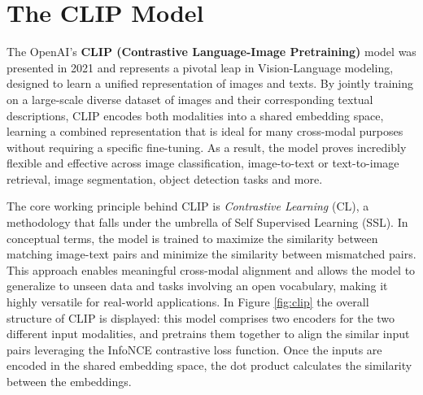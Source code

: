 \documentclass[a4paper, oneside, english]{sapthesis} %
\begin{document}




\chapter{The CLIP Model} %

The OpenAI's \textbf{CLIP (Contrastive Language-Image Pretraining)} model \cite{radford2021learning} was presented in 2021 and represents a pivotal leap in Vision-Language modeling, designed to learn a unified representation of images and texts. By jointly training on a large-scale diverse dataset of images and their corresponding textual descriptions, CLIP encodes both modalities into a shared embedding space, learning a combined representation that is ideal for many cross-modal purposes without requiring a specific fine-tuning. As a result, the model proves incredibly flexible and effective across image classification, image-to-text or text-to-image retrieval, image segmentation, object detection tasks and more.

The core working principle behind CLIP is \emph{Contrastive Learning} (CL), a methodology that falls under the umbrella of Self Supervised Learning (SSL). In conceptual terms, the model is trained to maximize the similarity between matching image-text pairs and minimize the similarity between mismatched pairs. This approach enables meaningful cross-modal alignment and allows the model to generalize to unseen data and tasks involving an open vocabulary, making it highly versatile for real-world applications. In Figure \ref{fig:clip} the overall structure of CLIP is displayed: this model comprises two encoders for the two different input modalities, and pretrains them together to align the similar input pairs leveraging the InfoNCE contrastive loss function. Once the inputs are encoded in the shared embedding space, the dot product calculates the similarity between the embeddings.
\end{document}
